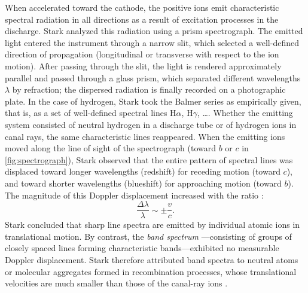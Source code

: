 \documentclass[pdflatex]{sn-jnl}
\begin{document}
When accelerated toward the cathode, the positive ions emit characteristic spectral radiation in all directions as a result of excitation processes in the discharge. Stark analyzed this radiation using a prism spectrograph. The emitted light entered the instrument through a narrow slit, which selected a well-defined direction of propagation (longitudinal or transverse with respect to the ion motion). After passing through the slit, the light is rendered approximately parallel and passed through a glass prism, which separated different wavelengths $\lambda$ by refraction; the dispersed radiation is finally recorded on a photographic plate. In the case of hydrogen, Stark took the Balmer series as empirically given, that is, as a set of well-defined spectral lines $\mathrm{H}\alpha$, $\mathrm{H}\gamma$, \dots \citep[417]{Stark1906}. Whether the emitting system consisted of neutral hydrogen in a discharge tube or of hydrogen ions in canal rays, the same characteristic lines reappeared. When the emitting ions moved along the line of sight of the spectrograph (toward $b$ or $c$ in \cref{fig:spectrograph}), Stark observed that the entire pattern of spectral lines was displaced toward longer wavelengths (redshift) for receding motion (toward $c$), and toward shorter wavelengths (blueshift) for approaching motion (toward $b$). The magnitude of this Doppler displacement increased with the ratio \betafactorh:
%
\begin{equation*}
\frac{\Delta\lambda}{\lambda} \sim \pm \frac{v}{c}.
\end{equation*}
%
Stark concluded that sharp line spectra  are emitted by individual atomic ions in translational motion. By contrast, the \emph{band spectrum} ---consisting of groups of closely spaced lines forming characteristic bands---exhibited no measurable Doppler displacement. Stark therefore attributed band spectra to neutral atoms or molecular aggregates formed in recombination processes, whose translational velocities are much smaller than those of the canal-ray ions \citep[426]{Stark1906}.
\end{document}
